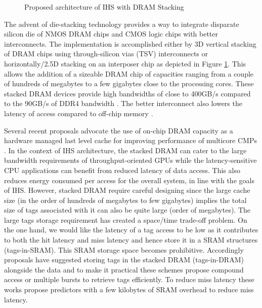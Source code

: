\begin{figure}[!htb]
	\centering
	\def\svgwidth{0.9\columnwidth}
	
	\caption{Proposed architecture of IHS with DRAM Stacking}
	\label{fig:stackdram}
\end{figure}
\par The advent of die-stacking technology \cite{3d-stacking} provides a way to integrate disparate silicon die of NMOS DRAM chips and CMOS logic chips with better interconnects. The implementation is accomplished either by 3D vertical stacking of DRAM chips using through-silicon vias (TSV) interconnects or horizontally/2.5D stacking on an interposer chip as depicted in Figure \ref{fig:stackdram}. This allows the addition of a sizeable DRAM chip of capacities ranging from a couple of hundreds of megabytes to a few gigabytes close to the processing cores. These stacked DRAM devices provide high bandwidths of close to 400GB/s compared to the 90GB/s of DDR4 bandwidth \cite{xeonphi}. The better interconnect also lowers the latency of access compared to off-chip memory \cite{alloy}. 
\par Several recent proposals advocate the use of on-chip DRAM capacity as a hardware managed last level cache for improving performance of multicore CMPs \cite{alloy,bimodal,loh-hill,atcache,footprint}. In the context of IHS architecture, the stacked DRAM can cater to the large bandwidth requirements of throughput-oriented GPUs while the latency-sensitive CPU applications can benefit from reduced latency of data access. This also reduces energy consumed per access for the overall system, in line with the goals of IHS.
However, stacked DRAM require careful designing since the large cache size (in the order of hundreds of megabytes to few gigabytes) implies the total size of tags associated with it can also be quite large (order of megabytes). The large tags storage requirement has created a space/time trade-off problem. On the one hand, we would like the latency of a tag access to be low as it contributes to both the hit latency and miss latency and hence store it in a SRAM structures (tags-in-SRAM). This SRAM storage space becomes prohibitive. Accordingly proposals have suggested storing tags in the stacked DRAM (tags-in-DRAM) alongside the data and to make it practical these schemes propose compound access \cite{loh-hill} or multiple bursts \cite{alloy} to retrieve tags efficiently. To reduce miss latency these works propose predictors with a few kilobytes of SRAM overhead to reduce miss latency.

